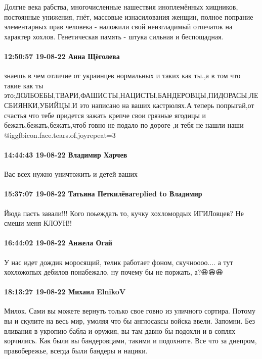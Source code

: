 Долгие века рабства, многочисленные нашествия иноплемённых хищников, постоянные
унижения, гнёт, массовые изнасилования женщин, полное попрание элементарных
прав человека - наложили свой неизгладимый отпечаток на характер хохлов.
Генетическая память - штука сильная и беспощадная.

\paragraph{12:50:57 19-08-22 Анна Щёголева}

знаешь в чем отличие от украинцев нормальных и таких как ты.,а в том что такие
как ты
это:ДОЛБОЕБЫ,ТВАРИ,ФАШИСТЫ,НАЦИСТЫ,БАНДЕРОВЦЫ,ПИДОРАСЫ,ЛЕСБИЯНКИ,УБИЙЦЫ.И это
написано на ваших кастрюлях.А теперь попрыгай,от счастья что тебе придется
зажать крепче свои грязные ягодицы и бежать,бежать,бежать,чтоб говно не подало
по дороге ,и тебя не нашли наши  @igg{fbicon.face.tears.of.joy}{repeat=3}  

\paragraph{14:44:43 19-08-22 Владимир Харчев}

Вас всех нужно уничтожить и детей ваших

\paragraph{15:37:07 19-08-22 Татьяна Петкилёваreplied to Владимир}

Йюда пасть завали!!! Кого поьеждать то, кучку хохломордых ИГИЛовцев? Не смеши
меня КЛОУН!!


\paragraph{16:44:02 19-08-22 Анжела Огай}

У нас идет дождик моросящий, телик работает фоном, скучноооо.... а тут
хохложопых дебилов понабежало, ну почему бы не поржать, а?😆😆😆

\paragraph{18:13:27 19-08-22 Михаил ElnikoV}

Милок. Сами вы можете вернуть только свое говно из уличного сортира.
Потому вы и скулите на весь мир, умоляя что бы англосаксы войска ввели.
Запомни. Без вливания в укропию бабла и оружия, вы там давно бы подохли и в соплях корчились.
Как были вы бандеровцами, такими и подохните. Все что за днепром, правобережье, всегда были бандеры и нацики.

